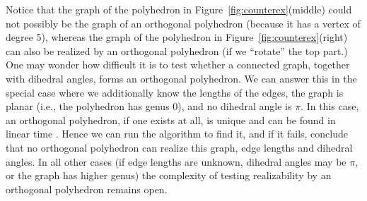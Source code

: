 \documentclass[12pt]{article}
\begin{document}
Notice that the graph of the polyhedron in Figure~\ref{fig:counterex}(middle) could
not possibly be the graph of an orthogonal polyhedron (because it has a vertex
of degree 5), whereas the graph of the polyhedron in Figure~\ref{fig:counterex}(right)
can also be realized by
an orthogonal polyhedron (if we ``rotate'' the top part.) 
One may wonder how difficult it is to test whether a connected graph, together
with dihedral angles, forms an orthogonal polyhedron.  We can answer this in
the special case where we additionally know the lengths of the
edges, the graph is planar (i.e., the polyhedron has genus 0), and
no dihedral angle is $\pi$.  In this case, an orthogonal polyhedron, if one
exists at all, is unique and can be found in linear time \cite{BG11b}.
Hence we can run the algorithm to find it, and if it fails, conclude that
no orthogonal polyhedron can realize this graph, edge lengths and dihedral
angles.  In all other cases
(if edge lengths are unknown, dihedral angles may be $\pi$, or
the graph has higher genus) the complexity of testing realizability by
an orthogonal polyhedron remains open.





\end{document}
